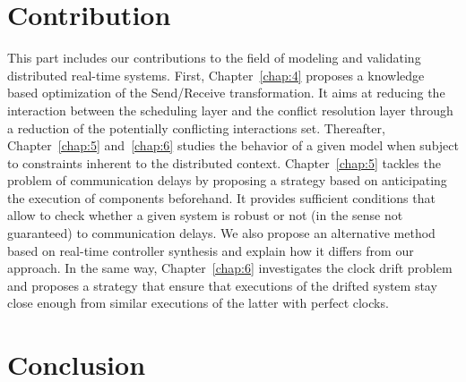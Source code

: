 \documentclass[a4paper,Times,twoside,index,12pt]{Classes/PhDThesisPSnPDF}
\begin{document}
\part{Contribution}
{This part includes our contributions to the field of modeling and validating
distributed real-time systems. First, Chapter~\ref{chap:4} proposes a knowledge based
optimization of the Send/Receive transformation. It aims at reducing the interaction between
the scheduling layer and the conflict resolution layer through a reduction of the potentially
conflicting interactions set. Thereafter, Chapter~\ref{chap:5} and~\ref{chap:6} studies the 
behavior of a given model when subject to constraints inherent to the distributed context.
Chapter~\ref{chap:5} tackles the problem of communication delays by proposing a strategy based
on anticipating the execution of components beforehand. It provides sufficient conditions
that allow to check whether a given system is robust or not (in the sense not guaranteed) 
to communication delays. We also propose an alternative method based on real-time controller
synthesis and explain how it differs from our approach. 
In the same way, Chapter~\ref{chap:6} investigates the clock drift problem and proposes a 
strategy that ensure that executions of the drifted system stay close enough from similar 
executions of the latter with perfect clocks.
}




%
\part{Conclusion}
{}

\listoffigures 

\listoftables 



\begin{spacing}{0.9}



\cleardoublepage




\end{spacing}
\end{document}
